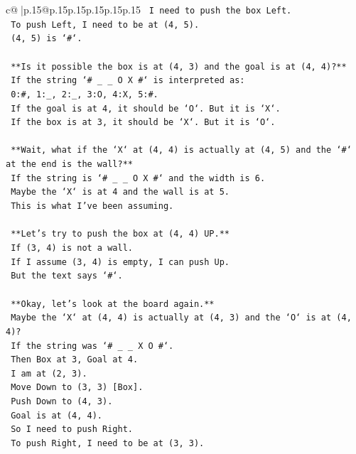 \documentclass{article}
\begin{document}
{\begin{supertabular}{c@{$\;$}|p{.15\linewidth}@{}p{.15\linewidth}p{.15\linewidth}p{.15\linewidth}p{.15\linewidth}p{.15\linewidth}}
{{{\texttt{    I need to push the box Left.} \\
\texttt{    To push Left, I need to be at (4, 5).} \\
\texttt{    (4, 5) is `\#`.} \\
\\ 
\texttt{    **Is it possible the box is at (4, 3) and the goal is at (4, 4)?**} \\
\texttt{    If the string `\# \_ \_ O X \#` is interpreted as:} \\
\texttt{    0:\#, 1:\_, 2:\_, 3:O, 4:X, 5:\#.} \\
\texttt{    If the goal is at 4, it should be `O`. But it is `X`.} \\
\texttt{    If the box is at 3, it should be `X`. But it is `O`.} \\
\\ 
\texttt{    **Wait, what if the `X` at (4, 4) is actually at (4, 5) and the `\#` at the end is the wall?**} \\
\texttt{    If the string is `\# \_ \_ O X \#` and the width is 6.} \\
\texttt{    Maybe the `X` is at 4 and the wall is at 5.} \\
\texttt{    This is what I've been assuming.} \\
\\ 
\texttt{    **Let's try to push the box at (4, 4) UP.**} \\
\texttt{    If (3, 4) is not a wall.} \\
\texttt{    If I assume (3, 4) is empty, I can push Up.} \\
\texttt{    But the text says `\#`.} \\
\\ 
\texttt{    **Okay, let's look at the board again.**} \\
\texttt{    Maybe the `X` at (4, 4) is actually at (4, 3) and the `O` is at (4, 4)?} \\
\texttt{    If the string was `\# \_ \_ X O \#`.} \\
\texttt{    Then Box at 3, Goal at 4.} \\
\texttt{    I am at (2, 3).} \\
\texttt{    Move Down to (3, 3) {[}Box{]}.} \\
\texttt{    Push Down to (4, 3).} \\
\texttt{    Goal is at (4, 4).} \\
\texttt{    So I need to push Right.} \\
\texttt{    To push Right, I need to be at (3, 3).} \\
}}}
\end{supertabular}}
\end{document}
